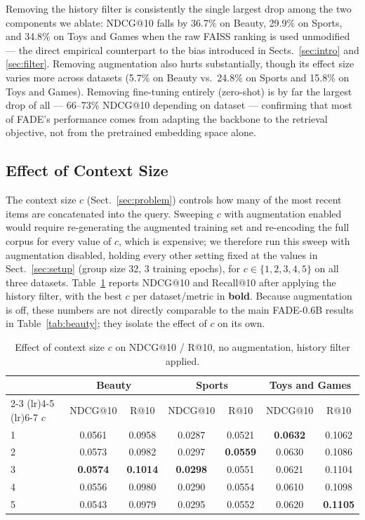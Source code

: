 \documentclass[runningheads]{llncs}
\begin{document}
Removing the history filter is consistently the single largest drop among the two components we ablate: NDCG@10 falls by 36.7\% on Beauty, 29.9\% on Sports, and 34.8\% on Toys and Games when the raw FAISS ranking is used unmodified --- the direct empirical counterpart to the bias introduced in Sects.~\ref{sec:intro} and \ref{sec:filter}. Removing augmentation also hurts substantially, though its effect size varies more across datasets (5.7\% on Beauty vs.\ 24.8\% on Sports and 15.8\% on Toys and Games). Removing fine-tuning entirely (zero-shot) is by far the largest drop of all --- 66--73\% NDCG@10 depending on dataset --- confirming that most of FADE's performance comes from adapting the backbone to the retrieval objective, not from the pretrained embedding space alone.

\subsection{Effect of Context Size}
\label{sec:context}
The context size $c$ (Sect.~\ref{sec:problem}) controls how many of the most recent items are concatenated into the query. Sweeping $c$ with augmentation enabled would require re-generating the augmented training set and re-encoding the full corpus for every value of $c$, which is expensive; we therefore run this sweep with augmentation disabled, holding every other setting fixed at the values in Sect.~\ref{sec:setup} (group size 32, 3 training epochs), for $c \in \{1,2,3,4,5\}$ on all three datasets. Table~\ref{tab:context} reports NDCG@10 and Recall@10 after applying the history filter, with the best $c$ per dataset/metric in \textbf{bold}. Because augmentation is off, these numbers are not directly comparable to the main FADE-0.6B results in Table~\ref{tab:beauty}; they isolate the effect of $c$ on its own.

\begin{table}[H]
\centering
\caption{Effect of context size $c$ on NDCG@10 / R@10, no augmentation, history filter applied.}
\label{tab:context}
\footnotesize
\begin{tabular}{lcccccc}
\toprule
& \multicolumn{2}{c}{Beauty} & \multicolumn{2}{c}{Sports} & \multicolumn{2}{c}{Toys and Games} \\
\cmidrule(lr){2-3} \cmidrule(lr){4-5} \cmidrule(lr){6-7}
$c$ & NDCG@10 & R@10 & NDCG@10 & R@10 & NDCG@10 & R@10 \\
\midrule
1 & 0.0561 & 0.0958 & 0.0287 & 0.0521 & \textbf{0.0632} & 0.1062 \\
2 & 0.0573 & 0.0982 & 0.0297 & \textbf{0.0559} & 0.0630 & 0.1086 \\
3 & \textbf{0.0574} & \textbf{0.1014} & \textbf{0.0298} & 0.0551 & 0.0621 & 0.1104 \\
4 & 0.0556 & 0.0980 & 0.0290 & 0.0554 & 0.0610 & 0.1098 \\
5 & 0.0543 & 0.0979 & 0.0295 & 0.0552 & 0.0620 & \textbf{0.1105} \\
\bottomrule
\end{tabular}
\end{table}
\end{document}

